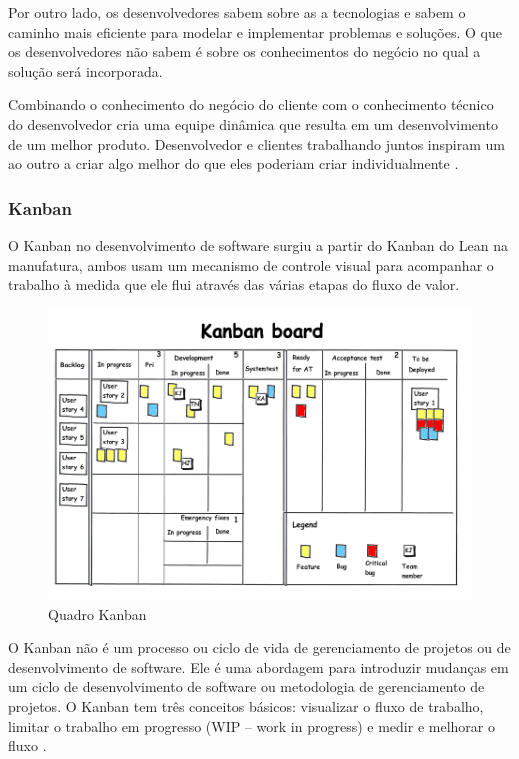 Por outro lado, os desenvolvedores sabem sobre as a tecnologias e sabem o caminho mais eficiente para modelar e implementar problemas e soluções. O que os desenvolvedores não sabem é sobre os conhecimentos do negócio no qual a solução será incorporada. 

Combinando o conhecimento do negócio do cliente com o conhecimento técnico do desenvolvedor cria uma equipe dinâmica que resulta em um desenvolvimento de um melhor produto. Desenvolvedor e clientes trabalhando juntos inspiram um ao outro a criar algo melhor do que eles poderiam criar individualmente \cite{hibbs2009}.


\subsubsection[Kanban]{Kanban}

O Kanban no desenvolvimento de software surgiu a partir do Kanban do Lean na manufatura, ambos usam um mecanismo de controle visual para acompanhar o trabalho à medida que ele flui através das várias etapas do fluxo de valor. 

\begin{figure}[h]
		\centering
		\label{fig05}
			\includegraphics[scale=0.7]{figuras/kanban.png}
		\caption{Quadro Kanban \cite{kanban}}
\end{figure}

O Kanban não é um processo ou ciclo de vida de gerenciamento de projetos ou de desenvolvimento de software. Ele é uma abordagem para introduzir mudanças em um ciclo de desenvolvimento de software ou metodologia de gerenciamento de projetos. O Kanban tem três conceitos básicos: visualizar o fluxo de trabalho, limitar o trabalho em progresso (WIP – work in progress) e medir e melhorar o fluxo \cite{kniberg2009}. 

